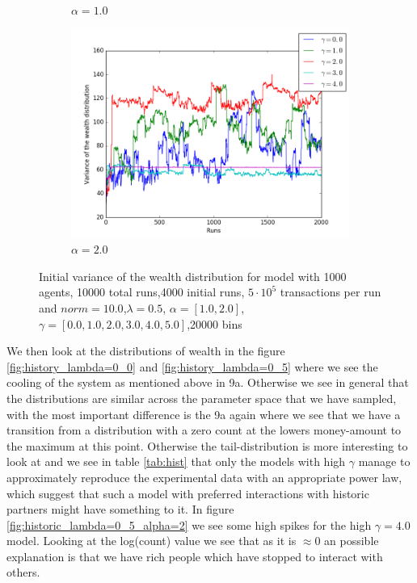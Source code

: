 \documentclass[a4paper,11pt]{article}
\begin{document}
{\begin{figure}[H]
\begin{subfigure}[t]{0.45\textwidth}
		\caption{$\alpha=1.0$ }
		\label{fig:historic_lambda=0_0_alpha=1init}
	\end{subfigure}
	\begin{subfigure}[t]{0.45\textwidth}
		\includegraphics[scale=0.4]{historic_lambda=0_0_alpha=2init}
		\caption{$\alpha=2.0$}
		\label{fig:historic_lambda=0_0_alpha=2init}
	\end{subfigure}
	\caption{Initial variance of the wealth distribution for model with 1000 agents, 10000 total runs,4000 initial runs,  $5\cdot 10^{5}$ transactions per run and  $norm=10.0$,$\lambda=0.5$, $\alpha=[1.0,2.0]$, $\gamma=[0.0,1.0,2.0,3.0,4.0,5.0]$,20000 bins}
	\label{fig:equi}
\end{figure}

We then look at the distributions of wealth in the figure \ref{fig:history_lambda=0_0} and \ref{fig:history_lambda=0_5} where we see the cooling of the system as mentioned above in 9a. Otherwise we see in general that the distributions are similar across the parameter space that we have sampled, with the most important difference is the 9a again where we see that we have a transition from a distribution with a zero count at the lowers money-amount to the maximum at this point. Otherwise the tail-distribution is more interesting to look at and we see in table \ref{tab:hist} that only the models with high $\gamma$ manage to approximately reproduce the experimental data with an appropriate power law, which suggest that such a model with preferred interactions with historic partners might have something to it.  In figure \ref{fig:historic_lambda=0_5_alpha=2} we see some high spikes for the high $\gamma=4.0$ model. Looking at the log(count) value we see that as it is $\approx 0$ an possible explanation is that we have rich people which have stopped to interact with others. 


}
\end{document}
